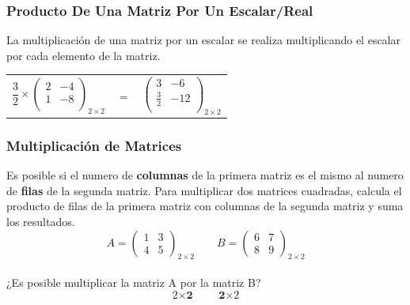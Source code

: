 \documentclass[stu, 12pt, letterpaper, donotrepeattitle, floatsintext, natbib]{apa7}
\begin{document}
\subsubsection{Producto De Una Matriz Por Un Escalar/Real}
La multiplicación de una matriz por un escalar se realiza multiplicando el escalar por cada elemento de la matriz.

\begin{table}[H]
\centering
\begin{tabular}{ccc}
$
\dfrac{3}{2} \times \begin{pmatrix}
2 & -4\\
1 & -8\\
\end{pmatrix}_{2\times2}
$  & $=$ & $
\begin{pmatrix}
3 & -6 \\
\frac{3}{2} & -12\\
\end{pmatrix}_{2\times2}
$\\ 

\end{tabular}
\end{table}


\subsubsection{Multiplicación de Matrices}
Es posible si el numero de \textbf{columnas} de la primera matriz es el mismo al numero de \textbf{filas} de la segunda matriz.
Para multiplicar dos matrices cuadradas, calcula el producto de filas de la primera matriz con columnas de la segunda matriz y suma los resultados.
$$
A=\begin{pmatrix}
1 & 3 \\ 4 & 5
\end{pmatrix}_{2\times2}
\qquad
B=\begin{pmatrix}
6 & 7 \\ 8 & 9
\end{pmatrix}_{2\times2}
$$\\

¿Es posible multiplicar la matriz A por la matriz B?
$${\textit{2}\times\textbf{2}} \qquad {\textbf{2}\times\textit{2}}$$\\
\end{document}
